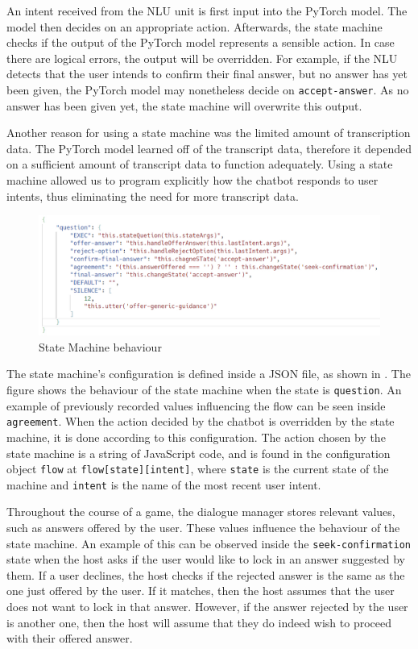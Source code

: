 \documentclass[hidelinks, 11pt]{article}
\begin{document}
An intent received from the NLU unit is first input into the PyTorch model. The model then decides on an appropriate action. Afterwards, the state machine checks if the output of the PyTorch model represents a sensible action. In case there are logical errors, the output will be overridden. For example, if the NLU detects that the user intends to confirm their final answer, but no answer has yet been given, the PyTorch model may nonetheless decide on \verb|accept-answer|. As no answer has been given yet, the state machine will overwrite this output.

Another reason for using a state machine was the limited amount of transcription data. The PyTorch model learned off of the transcript data, therefore it depended on a sufficient amount of transcript data to function adequately. Using a state machine allowed us to program explicitly how the chatbot responds to user intents, thus eliminating the need for more transcript data.

\begin{figure}[h!]
  \includegraphics[width=\columnwidth]{images/jacks_figure.png}
  \caption{State Machine behaviour}
  \label{fig:jacks_figure}
\end{figure}

The state machine's configuration is defined inside a JSON file, as shown in . The figure shows the behaviour of the state machine when the state is \verb|question|. An example of previously recorded values influencing the flow can be seen inside \verb|agreement|. When the action decided by the chatbot is overridden by the state machine, it is done according to this configuration. The action chosen by the state machine is a string of JavaScript code, and is found in the configuration object \verb|flow| at \verb|flow[state][intent]|, where \verb|state| is the current state of the machine and \verb|intent| is the name of the most recent user intent.

Throughout the course of a game, the dialogue manager stores relevant values, such as answers offered by the user. These values influence the behaviour of the state machine. An example of this can be observed inside the \verb|seek-confirmation| state when the host asks if the user would like to lock in an answer suggested by them. If a user declines, the host checks if the rejected answer is the same as the one just offered by the user. If it matches, then the host assumes that the user does not want to lock in that answer. However, if the answer rejected by the user is another one, then the host will assume that they do indeed wish to proceed with their offered answer.
\end{document}
